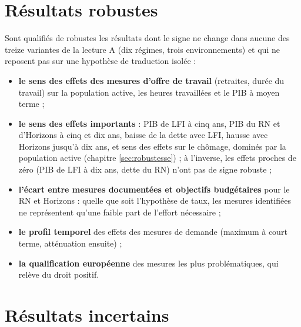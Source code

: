 \documentclass[
  11pt,
  11pt,
  a4paper,
  openany]{book}
\providecommand{\tightlist}{%
  \setlength{\itemsep}{0pt}\setlength{\parskip}{0pt}}
\begin{document}
\hypertarget{sec:robustes}{%
\section{Résultats robustes}\label{sec:robustes}}

Sont qualifiés de robustes les résultats dont le signe ne change dans
aucune des treize variantes de la lecture A (dix régimes, trois
environnements) et qui ne reposent pas sur une hypothèse de traduction
isolée :

\begin{itemize}
\tightlist
\item
  \textbf{le sens des effets des mesures d'offre de travail} (retraites,
  durée du travail) sur la population active, les heures travaillées et
  le PIB à moyen terme ;
\item
  \textbf{le sens des effets importants} : PIB de LFI à cinq ans, PIB du
  RN et d'Horizons à cinq et dix ans, baisse de la dette avec LFI,
  hausse avec Horizons jusqu'à dix ans, et sens des effets sur le
  chômage, dominés par la population active (chapitre
  \ref{sec:robustesse}) ; à l'inverse, les effets proches de zéro (PIB
  de LFI à dix ans, dette du RN) n'ont pas de signe robuste ;
\item
  \textbf{l'écart entre mesures documentées et objectifs budgétaires}
  pour le RN et Horizons : quelle que soit l'hypothèse de taux, les
  mesures identifiées ne représentent qu'une faible part de l'effort
  nécessaire ;
\item
  \textbf{le profil temporel} des effets des mesures de demande (maximum
  à court terme, atténuation ensuite) ;
\item
  \textbf{la qualification européenne} des mesures les plus
  problématiques, qui relève du droit positif.
\end{itemize}

\hypertarget{sec:incertains}{%
\section{Résultats incertains}\label{sec:incertains}}
\end{document}
